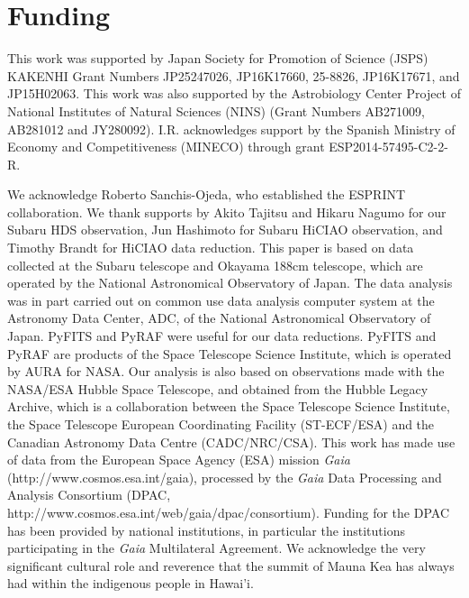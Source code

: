 \documentclass[]{pasj01}
\begin{document}
\section{Funding}

This work was supported by Japan Society for Promotion of Science (JSPS)
KAKENHI Grant Numbers JP25247026, JP16K17660, 25-8826, JP16K17671, and JP15H02063.
This work was also supported by the Astrobiology Center Project of
National Institutes of Natural Sciences (NINS)
(Grant Numbers AB271009, AB281012 and JY280092).
I.R. acknowledges support by the Spanish Ministry of Economy
and Competitiveness (MINECO) through grant ESP2014-57495-C2-2-R.

\begin{ack}
We acknowledge Roberto Sanchis-Ojeda, who established the ESPRINT collaboration.
We thank supports by Akito Tajitsu and Hikaru Nagumo for our Subaru HDS observation,
Jun Hashimoto for Subaru HiCIAO observation, and Timothy Brandt for HiCIAO data reduction.
This paper is based on data collected at the Subaru telescope and Okayama 188cm telescope,
which are operated by the National Astronomical Observatory of Japan.  
The data analysis was in part carried out on common use data analysis computer system
at the Astronomy Data Center, ADC, of the National Astronomical Observatory of Japan.
PyFITS and PyRAF were useful for our data reductions.
PyFITS and PyRAF are products of the Space Telescope Science Institute, which is operated by AURA for NASA.  
Our analysis is also based on observations made with the NASA/ESA Hubble Space Telescope,
and obtained from the Hubble Legacy Archive, which is a collaboration between
the Space Telescope Science Institute, the Space Telescope European Coordinating Facility (ST-ECF/ESA)
and the Canadian Astronomy Data Centre (CADC/NRC/CSA).
This work has made use of data from the European Space Agency (ESA)
mission {\it Gaia} (http://www.cosmos.esa.int/gaia), processed by
the {\it Gaia} Data Processing and Analysis Consortium (DPAC,
http://www.cosmos.esa.int/web/gaia/dpac/consortium). Funding
for the DPAC has been provided by national institutions, in particular
the institutions participating in the {\it Gaia} Multilateral Agreement.
We acknowledge the very significant cultural role and reverence that the
summit of Mauna Kea has always had within the indigenous people in Hawai'i. 
\end{ack}


%

\end{document}
